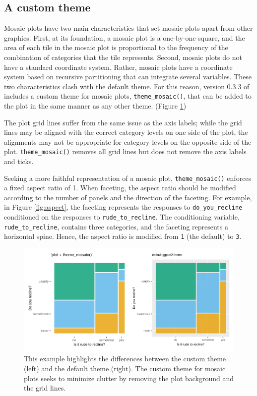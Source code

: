 \hypertarget{a-custom-theme}{%
\subsection*{A custom theme}\label{a-custom-theme}}

Mosaic plots have two main characteristics that set mosaic plots apart from other graphics. First, at its foundation, a mosaic plot is a one-by-one square, and the area of each tile in the mosaic plot is proportional to the frequency of the combination of categories that the tile represents. Second, mosaic plots do not have a standard coordinate system. Rather, mosaic plots have a coordinate system based on recursive partitioning that can integrate several variables. These two characteristics clash with the default  theme. For this reason, version 0.3.3 of  includes a custom theme for mosaic plots, \texttt{theme\_mosaic()}, that can be added to the plot in the same manner as any other  theme. (Figure \ref{fig:themes})

The plot grid lines suffer from the same issue as the axis labels; while the grid lines may be aligned with the
correct category levels on one side of the plot, the alignments may not be appropriate for category levels on the opposite side of the plot. \texttt{theme\_mosaic()} removes all grid lines but does not remove the axis labels and ticks.

Seeking a more faithful representation of a mosaic plot, \texttt{theme\_mosaic()} enforces a fixed aspect ratio of 1. When faceting, the aspect ratio should be modified according to the number of panels and the direction of the faceting. For example, in Figure \ref{fig:aspect}, the faceting represents the responses to \texttt{do\_you\_recline} conditioned on the responses to \texttt{rude\_to\_recline}. The conditioning variable, \texttt{rude\_to\_recline}, contains three categories, and the faceting represents a horizontal spine. Hence, the aspect ratio is modified from \texttt{1} (the default) to \texttt{3}.

\begin{figure}

{\centering \includegraphics[width=1\linewidth]{jeppson-hofmann_files/figure-latex/themes-1} 

}

\caption{This example highlights the differences between the custom theme (left) and the default theme (right). The custom theme for mosaic plots seeks to minimize clutter by removing the plot background and the grid lines.}\label{fig:themes}
\end{figure}

